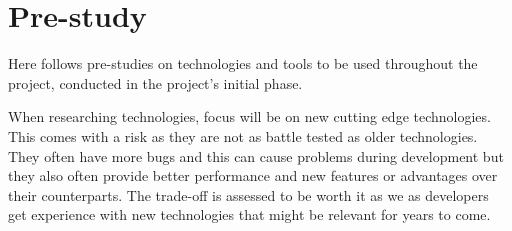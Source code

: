 \chapter{Pre-study}
Here follows pre-studies on technologies and tools to be used throughout the project, conducted in the project's initial phase.

When researching technologies, focus will be on new cutting edge technologies. 
This comes with a risk as they are not as battle tested as older technologies. 
They often have more bugs and this can cause problems during development but they also often provide better performance and new features or advantages over their counterparts. 
The trade-off is assessed to be worth it as we as developers get experience with new technologies that might be relevant for years to come.








